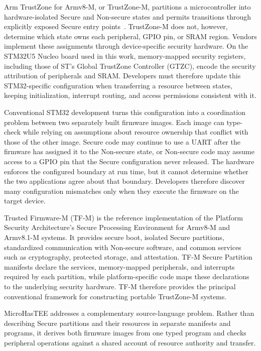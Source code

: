 \documentclass[sigconf]{acmart}
\begin{document}
Arm TrustZone for Armv8-M, or TrustZone-M, partitions a microcontroller into hardware-isolated Secure and Non-secure states and permits transitions through explicitly exposed Secure entry points~\cite{armTrustZoneM}.
TrustZone-M does not, however, determine which state owns each peripheral, GPIO pin, or SRAM region.
Vendors implement these assignments through device-specific security hardware.
On the STM32U5 Nucleo board used in this work, memory-mapped security registers, including those of ST's Global TrustZone Controller (GTZC), encode the security attribution of peripherals and SRAM.
Developers must therefore update this STM32-specific configuration when transferring a resource between states, keeping initialization, interrupt routing, and access permissions consistent with it.

Conventional STM32 development turns this configuration into a coordination problem between two separately built firmware images.
Each image can type-check while relying on assumptions about resource ownership that conflict with those of the other image.
Secure code may continue to use a UART after the firmware has assigned it to the Non-secure state, or Non-secure code may assume access to a GPIO pin that the Secure configuration never released.
The hardware enforces the configured boundary at run time, but it cannot determine whether the two applications agree about that boundary.
Developers therefore discover many configuration mismatches only when they execute the firmware on the target device.

Trusted Firmware-M (TF-M)\cite{tfm} is the reference implementation of the Platform Security Architecture's Secure Processing Environment for Armv8-M and Armv8.1-M systems.
It provides secure boot, isolated Secure partitions, standardized communication with Non-secure software, and common services such as cryptography, protected storage, and attestation.
TF-M Secure Partition manifests declare the services, memory-mapped peripherals, and interrupts required by each partition, while platform-specific code maps these declarations to the underlying security hardware.
TF-M therefore provides the principal conventional framework for constructing portable TrustZone-M systems.

MicroHasTEE addresses a complementary source-language problem.
Rather than describing Secure partitions and their resources in separate manifests and programs, it derives both firmware images from one typed program and checks peripheral operations against a shared account of resource authority and transfer.
\end{document}
